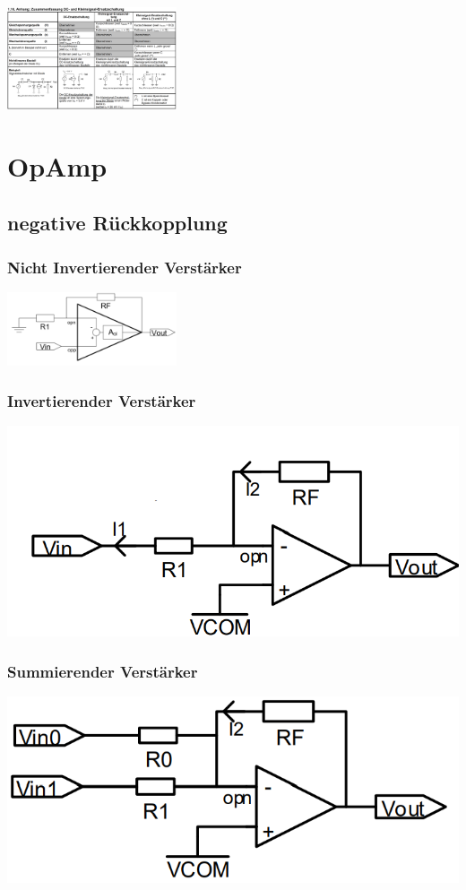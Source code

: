 \documentclass[margin=normal]{tex/hsrzf}
\begin{document}
\includegraphics[width = 5cm]{img/Tabelle Kleinsignal Ersatzschaltung.png}

\section{OpAmp}
\subsection{negative Rückkopplung}
\subsubsection*{Nicht Invertierender Verstärker}
\includegraphics[width = 5cm]{img/OpAmp/Verstaerker_nicht_invertierend.png}
\subsubsection*{Invertierender Verstärker}
\includegraphics{img/OpAmp/Verstaerker_invertierend.png}
\subsubsection*{Summierender Verstärker}
\includegraphics{img/OpAmp/Verstaerker_summierend.png}
\end{document}
